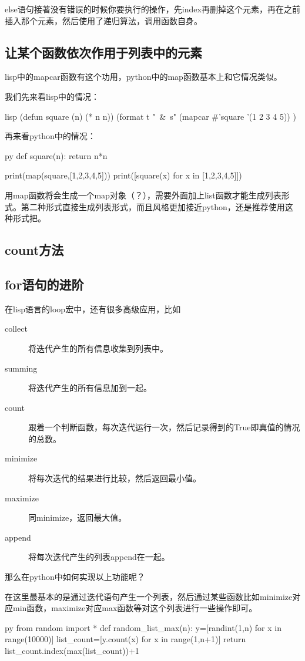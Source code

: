 \documentclass[12pt,oneside]{book}
\begin{document}
\begin{common-format}
else语句接著没有错误的时候你要执行的操作，先index再删掉这个元素，再在之前插入那个元素，然后使用了递归算法，调用函数自身。

\subsection{让某个函数依次作用于列表中的元素}
lisp中的mapcar函数有这个功用，python中的map函数基本上和它情况类似。

我们先来看lisp中的情况：
\begin{xverbatim}[129]{lisp}
(defun square (n) (* n n))
(format t "~&~s" (mapcar #'square '(1 2 3 4 5)) )
\end{xverbatim}

再来看python中的情况：
\begin{xverbatim}[129]{py}
def square(n):
    return n*n
    
print(map(square,[1,2,3,4,5]))
print([square(x) for x in [1,2,3,4,5]])
\end{xverbatim}
用map函数将会生成一个map对象（？），需要外面加上list函数才能生成列表形式。第二种形式直接生成列表形式，而且风格更加接近python，还是推荐使用这种形式把。


\subsection{count方法}

\subsection{for语句的进阶}
在lisp语言的loop宏中，还有很多高级应用，比如

\begin{description}
\item[collect] 将迭代产生的所有信息收集到列表中。
\item[summing] 将迭代产生的所有信息加到一起。
\item[count] 跟着一个判断函数，每次迭代运行一次，然后记录得到的True即真值的情况的总数。
\item[minimize] 将每次迭代的结果进行比较，然后返回最小值。
\item[maximize] 同minimize，返回最大值。
\item[append] 将每次迭代产生的列表append在一起。
\end{description}

那么在python中如何实现以上功能呢？

在这里最基本的是通过迭代语句产生一个列表，然后通过某些函数比如minimize对应min函数，maximize对应max函数等对这个列表进行一些操作即可。
\begin{xverbatim}[129]{py}
from random import *
def random_list_max(n):
    y=[randint(1,n) for x in range(10000)]
    list_count=[y.count(x) for x in range(1,n+1)]
    return list_count.index(max(list_count))+1


\end{xverbatim}
\end{common-format}
\end{document}
